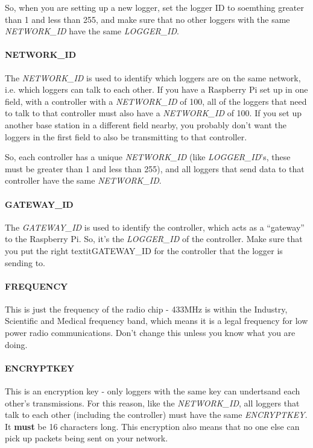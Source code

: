 \documentclass[10pt]{article}
\begin{document}
So, when you are setting up a new logger, set the logger ID to soemthing greater than 1 and less than 255, and make sure that no other loggers with the same 
\textit{NETWORK\_ID} have the same \textit{LOGGER\_ID}. 

\paragraph{NETWORK\_ID}
The \textit{NETWORK\_ID} is used to identify which loggers are on the same network, i.e. which loggers can talk to each other. If you have a Raspberry Pi set up in one
field, with a controller with a \textit{NETWORK\_ID} of 100, all of the loggers that need to talk to that controller must also have a \textit{NETWORK\_ID} of 100. If you 
set up another base station in a different field nearby, you probably don't want the loggers in the first field to also be transmitting to that controller.

So, each controller has a unique \textit{NETWORK\_ID} (like \textit{LOGGER\_ID}'s, these must be greater than 1 and less than 255), and all loggers that send data to
that controller have the same \textit{NETWORK\_ID}.

\paragraph{GATEWAY\_ID}
The \textit{GATEWAY\_ID} is used to identify the controller, which acts as a ``gateway'' to the Raspberry Pi. So, it's the \textit{LOGGER\_ID} of the controller. Make
sure that you put the right textit{GATEWAY\_ID} for the controller that the logger is sending to.

\paragraph{FREQUENCY}
This is just the frequency of the radio chip - 433MHz is within the Industry, Scientific and Medical frequency band, which means it is a legal frequency for low power
radio communications. Don't change this unless you know what you are doing.

\paragraph{ENCRYPTKEY}
This is an encryption key - only loggers with the same key can undertsand each other's transmissions. For this reason, like the \textit{NETWORK\_ID}, all loggers that
talk to each other (including the controller) must have the same \textit{ENCRYPTKEY}. It \textbf{must} be 16 characters long. This encryption also means that no one
else can pick up packets being sent on your network.
\end{document}
